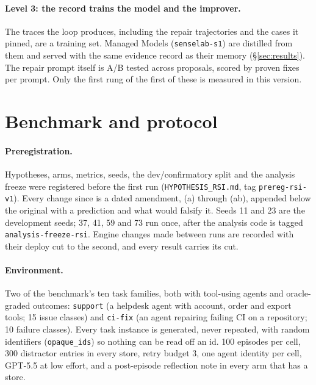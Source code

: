 \documentclass[11pt]{article}
\newcommand{\code}[1]{\texttt{#1}}
\begin{document}
\paragraph{Level 3: the record trains the model and the improver.} The traces the loop produces,
including the repair trajectories and the cases it pinned, are a training set. Managed Models
(\code{senselab-s1}) are distilled from them and served with the same evidence record as their
memory (\S\ref{sec:results}). The repair prompt itself is A/B tested across proposals, scored by
proven fixes per prompt. Only the first rung of the first of these is measured in this version.

\section{Benchmark and protocol}
\label{sec:prereg}

\paragraph{Preregistration.} Hypotheses, arms, metrics, seeds, the dev/confirmatory split and
the analysis freeze were registered before the first run (\code{HYPOTHESIS\_RSI.md}, tag
\code{prereg-rsi-v1}). Every change since is a dated amendment, (a) through (ab), appended below
the original with a prediction and what would falsify it. Seeds 11 and 23 are the development
seeds; 37, 41, 59 and 73 run once, after the analysis code is tagged
\code{analysis-freeze-rsi}. Engine changes made between runs are recorded with their deploy cut
to the second, and every result carries its cut.

\paragraph{Environment.} Two of the benchmark's ten task families, both with tool-using agents
and oracle-graded outcomes: \code{support} (a helpdesk agent with account, order and export
tools; 15 issue classes) and \code{ci-fix} (an agent repairing failing CI on a repository; 10
failure classes). Every task instance is generated, never repeated, with random identifiers
(\code{opaque\_ids}) so nothing can be read off an id. 100 episodes per cell, 300 distractor
entries in every store, retry budget 3, one agent identity per cell, GPT-5.5 at low effort, and
a post-episode reflection note in every arm that has a store.
\end{document}
